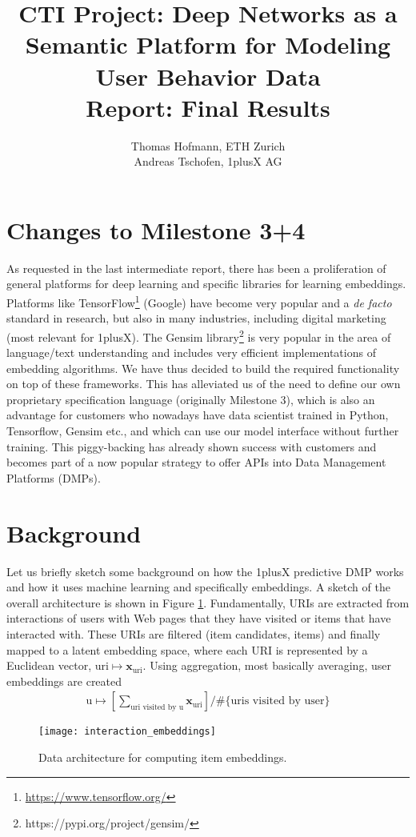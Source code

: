 \documentclass{article}
\author{Thomas Hofmann, ETH Zurich \\ Andreas Tschofen, 1plusX AG}
\title{CTI Project: Deep Networks as a Semantic Platform for Modeling User Behavior Data\\ [2mm] Report: Final Results}
\begin{document}
\maketitle

\section{Changes to Milestone 3+4} 

As requested in the last intermediate report, there has been a proliferation of general platforms for deep learning and specific libraries for learning embeddings. Platforms like TensorFlow\footnote{\url{https://www.tensorflow.org/}} (Google) have become very popular and a \textit{de facto} standard in research, but also in many industries, including digital marketing (most relevant for 1plusX). The Gensim library\footnote{https://pypi.org/project/gensim/} is very popular in the area of language/text understanding and includes very efficient implementations of embedding algorithms. We have thus decided to build the required functionality on top of these frameworks. This has alleviated us of the need to define our own proprietary specification language (originally Milestone 3), which is also an advantage for customers who nowadays have data scientist trained in Python, Tensorflow, Gensim etc., and which can use our model interface without further training. This piggy-backing has already shown success with customers and becomes part of a now popular strategy to offer APIs into Data Management Platforms (DMPs). 

\section{Background} 

Let us briefly sketch some background on how the 1plusX predictive DMP works and how it uses machine learning and specifically embeddings.  A sketch of the overall architecture is shown in Figure \ref{fig:architecture}. Fundamentally, URIs are extracted from interactions of users with Web pages that they have visited or items that have interacted with. These URIs are filtered (item candidates, items) and finally mapped to a latent embedding space, where each URI is represented by a Euclidean vector, $\text{uri} \mapsto \mathbf x_{\text{uri}}$. Using aggregation, most basically averaging, user embeddings are created 
\begin{align}
\text{u} \mapsto \left[ \sum_{ \text{uri visited by u}}  \mathbf x _{\text{uri}}  \right] \Big/  \# \{ \text{uris visited by user}\}
\end{align}
\begin{figure}
\begin{center}
\texttt{[image: interaction\_embeddings]}
\end{center}
\caption{Data architecture for computing item embeddings.}
\label{fig:architecture}
\end{figure}
\end{document}

